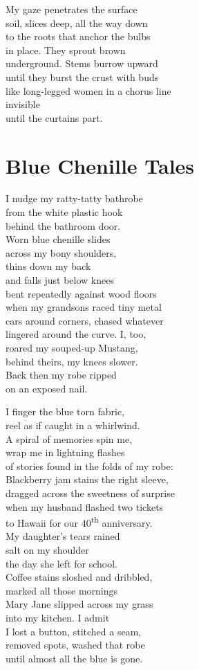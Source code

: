 \documentclass[twoside,10pt]{book}
\begin{document}
My gaze penetrates the surface\\
soil, slices deep, all the way down\\
to the roots that anchor the bulbs\\
in place. They sprout brown\\
underground. Stems burrow upward\\
until they burst the crust with buds\\
like long-legged women in a chorus line\\
invisible\\
until the curtains part.


\clearpage
\section{Blue Chenille Tales}

I nudge my ratty-tatty bathrobe\\
from the white plastic hook\\
behind the bathroom door.\\
Worn blue chenille slides\\
across my bony shoulders,\\
thins down my back\\
and falls just below knees\\
bent repeatedly against wood floors\\
when my grandsons raced tiny metal\\
cars around corners, chased whatever\\
lingered around the curve. I, too,\\
roared my souped-up Mustang,\\
behind theirs, my knees slower.\\
Back then my robe ripped\\
on an exposed nail.

I finger the blue torn fabric,\\
reel as if caught in a whirlwind.\\
A spiral of memories spin me,\\
wrap me in lightning flashes\\
of stories found in the folds of my robe:\\
Blackberry jam stains the right sleeve,\\
dragged across the sweetness of surprise\\
when my husband flashed two tickets\\
to Hawaii for our 40\textsuperscript{th} anniversary.\\
My daughter's tears rained\\
salt on my shoulder\\
the day she left for school.\\
Coffee stains sloshed and dribbled,\\
marked all those mornings\\
Mary Jane slipped across my grass\\
into my kitchen. I admit\\
I lost a button, stitched a seam,\\
removed spots, washed that robe\\
until almost all the blue is gone.
\end{document}
